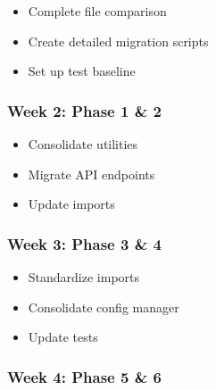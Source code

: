 \documentclass[11pt,a4paper]{article}
\begin{document}
\begin{itemize}
\item Complete file comparison
\end{itemize}

\begin{itemize}
\item Create detailed migration scripts
\end{itemize}

\begin{itemize}
\item Set up test baseline
\end{itemize}

\subsubsection{Week 2: Phase 1 & 2}

\begin{itemize}
\item Consolidate utilities
\end{itemize}

\begin{itemize}
\item Migrate API endpoints
\end{itemize}

\begin{itemize}
\item Update imports
\end{itemize}

\subsubsection{Week 3: Phase 3 & 4}

\begin{itemize}
\item Standardize imports
\end{itemize}

\begin{itemize}
\item Consolidate config manager
\end{itemize}

\begin{itemize}
\item Update tests
\end{itemize}

\subsubsection{Week 4: Phase 5 & 6}
\end{document}
